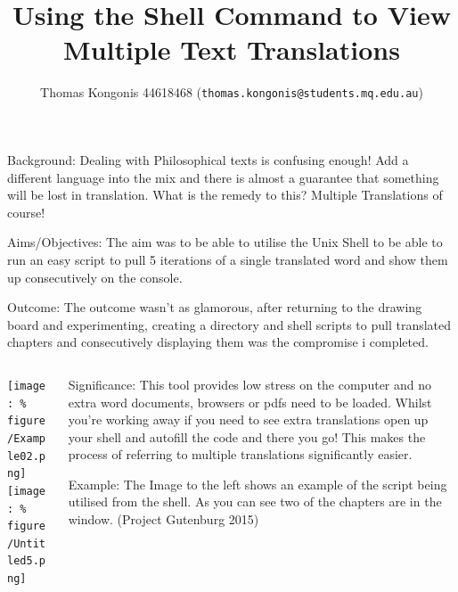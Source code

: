 \documentclass[unknownkeysallowed,usepdftitle=false, aspectratio=169, parskip=full]{beamer}
\title{Using the Shell Command to View Multiple Text Translations}
\author{Thomas Kongonis 44618468\inst{1} (\texttt{thomas.kongonis@students.mq.edu.au})}
\newcommand{\secvariable}{nothing}
\newcommand{\mysection}[1]{\renewcommand{\secvariable}{#1}
}
\begin{document}
\mysection{abstract}
\begin{frame}\label{\secvariable}



\parbox{\linewidth}{


\vspace{12pt}

Background: Dealing with Philosophical texts is confusing enough! Add a different language into the mix and there is almost a guarantee that something will be lost in translation. What is the remedy to this? Multiple Translations of course!

 \vspace{12pt}
 
Aims/Objectives: The aim was to be able to utilise the Unix Shell to be able to run an easy script to pull 5 iterations of a single translated word and show them up consecutively on the console. 

 \vspace{12pt}
 
Outcome: The outcome wasn't as glamorous, after returning to the drawing board and experimenting, creating a directory and shell scripts to pull translated chapters and consecutively displaying them was the compromise i completed.  
}


   
\end{frame}

\begin{frame}\label{\secvariable}
  \begin{columns}[t]
  \begin{column}[c]{0.45\textwidth}
\texttt{[image: \%
figure/Example02.png]}\\
\vspace{12pt}
\texttt{[image: \%
figure/Untitled5.png]}
    \end{column}
    \begin{column}[c]{0.45\textwidth}
    \parbox{\linewidth}{

      Significance: This tool provides low stress on the computer and no extra word documents, browsers or pdfs need to be loaded. Whilst you're working away if you need to see extra translations open up your shell and autofill the code and there you go! This makes the process of referring to multiple translations significantly easier. 
      
      \vspace{12pt}
      
     Example: The Image to the left shows an example of the script being utilised from the shell. As you can see two of the chapters are in the window. (Project Gutenburg 2015)
      }
    \end{column}
    
  \end{columns}

  
\end{frame}
\end{document}
